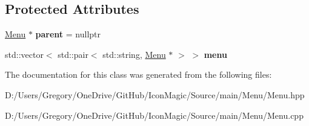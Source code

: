 \subsection*{Protected Attributes}
\begin{DoxyCompactItemize}
\item 
\hypertarget{class_menu_a80c14bde1c02ea015233b942ce81bdaa}{}\hyperlink{class_menu}{Menu} $\ast$ {\bfseries parent} = nullptr\label{class_menu_a80c14bde1c02ea015233b942ce81bdaa}

\item 
\hypertarget{class_menu_abb38f232d59205161dd37d752f881bb2}{}std\+::vector$<$ std\+::pair$<$ std\+::string, \hyperlink{class_menu}{Menu} $\ast$ $>$ $>$ {\bfseries menu}\label{class_menu_abb38f232d59205161dd37d752f881bb2}

\end{DoxyCompactItemize}


The documentation for this class was generated from the following files\+:\begin{DoxyCompactItemize}
\item 
D\+:/\+Users/\+Gregory/\+One\+Drive/\+Git\+Hub/\+Icon\+Magic/\+Source/main/\+Menu/Menu.\+hpp\item 
D\+:/\+Users/\+Gregory/\+One\+Drive/\+Git\+Hub/\+Icon\+Magic/\+Source/main/\+Menu/Menu.\+cpp\end{DoxyCompactItemize}

